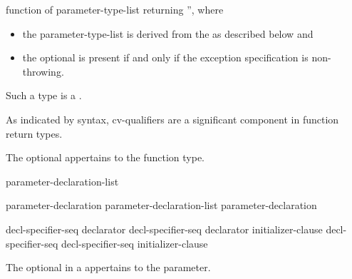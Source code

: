 function of parameter-type-list
 
returning '', where
\begin{itemize}
\item
the parameter-type-list is derived from
the  as described below and
\item
the optional  is present if and only if
the exception specification is non-throwing.
\end{itemize}
Such a type is a .
\begin{footnote}
As indicated by syntax, cv-qualifiers are a significant component in function return types.
\end{footnote}
The optional 
appertains to the function type.

\pnum
{}%
\begin{bnf}
\br
     \br
    parameter-declaration-list \terminal{,} 
\end{bnf}

\begin{bnf}
\br
    parameter-declaration\br
    parameter-declaration-list \terminal{,} parameter-declaration
\end{bnf}

\begin{bnf}
\br
      decl-specifier-seq declarator\br
     decl-specifier-seq declarator \terminal{=} initializer-clause\br
      decl-specifier-seq \br
     decl-specifier-seq  \terminal{=} initializer-clause
\end{bnf}

The optional  in a 
appertains to the parameter.

